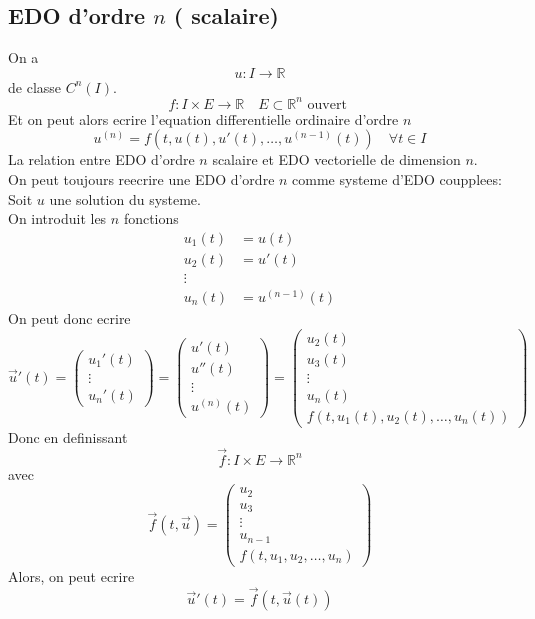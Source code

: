 \documentclass[../main.tex]{subfiles}
\begin{document}
\subsection*{EDO d'ordre $n$ ( scalaire) }
On a 
\[ 
u: I \to \mathbb{R}
\]
de classe $C^{n}( I) $.\\
\[ 
f:I \times E \to \mathbb{R}\quad E \subset \mathbb{R}^n \text{ ouvert } 
\]
Et on peut alors ecrire l'equation differentielle ordinaire d'ordre $n$ 
\[ 
	u^{( n) } = f( t, u( t) , u'( t) , \ldots, u^{( n-1) }( t) ) \quad \forall t \in I
\]
La relation entre EDO d'ordre  $n$ scalaire et EDO vectorielle de dimension $n$.\\
On peut toujours reecrire une EDO d'ordre $n$ comme systeme d'EDO coupplees:\\
Soit $u$ une solution du systeme.\\
On introduit les $n$ fonctions 
\begin{align*}
	u_1( t) &= u( t) \\
	u_2( t) &= u'( t) \\
	\vdots &\\
	u_n ( t) &= u^{( n-1) }( t) 
\end{align*}
On peut donc ecrire
\[ 
	\vec{u}'( t) = \begin{pmatrix}
		u_1'( t) \\ \vdots \\ u_n'( t) 
	\end{pmatrix} = \begin{pmatrix}
	u'( t) \\
	u''( t) \\
	\vdots \\ 
	u^{(n)}( t) 
	\end{pmatrix} =
	\begin{pmatrix}
		u_2( t) \\
		u_3( t) \\
		\vdots\\
		u_n( t) \\
		f( t,u_1( t) , u_2( t) , \ldots, u_n( t) ) 
	\end{pmatrix} 
\]
Donc en definissant
\[ 
\vec{f}: I \times E \to \mathbb{R}^n
\]
avec
\[ 
	\vec{f}( t,\vec{u}) = 
	\begin{pmatrix}
	u_2\\
	u_3\\
	\vdots\\ 
	u_{n-1} \\
	f( t,u_1,u_2, \ldots, u_n) 
	\end{pmatrix} 
\]
Alors, on peut ecrire
\[ 
	\vec{u}'( t) = \vec{f}( t,\vec{u}( t) ) 
\]
\end{document}
